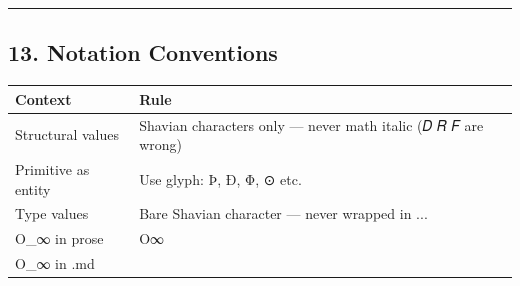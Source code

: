 \begin{center}\rule{0.5\linewidth}{0.5pt}\end{center}

\hypertarget{notation-conventions}{%
\subsection{13. Notation Conventions}\label{notation-conventions}}

\begin{longtable}[]{@{}ll@{}}
\toprule
\begin{minipage}[b]{0.56\columnwidth}\raggedright
Context\strut
\end{minipage} & \begin{minipage}[b]{0.38\columnwidth}\raggedright
Rule\strut
\end{minipage}\tabularnewline
\midrule
\endhead
\begin{minipage}[t]{0.56\columnwidth}\raggedright
Structural values\strut
\end{minipage} & \begin{minipage}[t]{0.38\columnwidth}\raggedright
Shavian characters only --- never math italic (𝐷 𝑅 𝐹 are wrong)\strut
\end{minipage}\tabularnewline
\begin{minipage}[t]{0.56\columnwidth}\raggedright
Primitive as entity\strut
\end{minipage} & \begin{minipage}[t]{0.38\columnwidth}\raggedright
Use glyph: Þ, Ð, Φ, ⊙ etc.\strut
\end{minipage}\tabularnewline
\begin{minipage}[t]{0.56\columnwidth}\raggedright
Type values\strut
\end{minipage} & \begin{minipage}[t]{0.38\columnwidth}\raggedright
Bare Shavian character --- never wrapped in \(...\)\strut
\end{minipage}\tabularnewline
\begin{minipage}[t]{0.56\columnwidth}\raggedright
O\_∞ in prose\strut
\end{minipage} & \begin{minipage}[t]{0.38\columnwidth}\raggedright
O∞\strut
\end{minipage}\tabularnewline
\begin{minipage}[t]{0.56\columnwidth}\raggedright
O\_∞ in .md\strut
\end{minipage} & \begin{minipage}[t]{0.38\columnwidth}\raggedright

\end{minipage}
\end{longtable}
